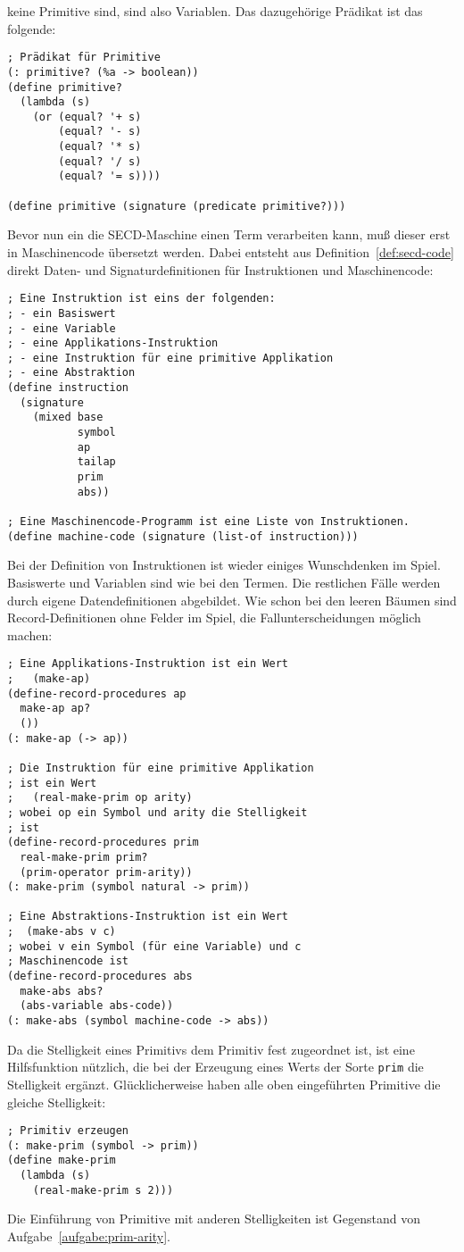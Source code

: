 keine Primitive sind, sind also Variablen.  Das dazugehörige Prädikat
ist das folgende:
%
\begin{verbatim}
; Prädikat für Primitive
(: primitive? (%a -> boolean))
(define primitive?
  (lambda (s)
    (or (equal? '+ s)
        (equal? '- s)
        (equal? '* s)
        (equal? '/ s)
        (equal? '= s))))

(define primitive (signature (predicate primitive?)))
\end{verbatim}
%
Bevor nun ein die SECD-Maschine einen Term verarbeiten kann, muß
dieser erst in Maschinencode übersetzt werden.  Dabei entsteht aus
Definition~\ref{def:secd-code} direkt Daten- und Signaturdefinitionen
für Instruktionen und Maschinencode:
%
\begin{verbatim}
; Eine Instruktion ist eins der folgenden:
; - ein Basiswert
; - eine Variable
; - eine Applikations-Instruktion
; - eine Instruktion für eine primitive Applikation
; - eine Abstraktion
(define instruction
  (signature
    (mixed base
           symbol
           ap
           tailap
           prim
           abs))

; Eine Maschinencode-Programm ist eine Liste von Instruktionen.
(define machine-code (signature (list-of instruction)))
\end{verbatim}
%
Bei der Definition von Instruktionen ist wieder einiges Wunschdenken
im Spiel.  Basiswerte und Variablen sind wie bei den Termen.  Die
restlichen Fälle werden durch eigene Datendefinitionen abgebildet.
Wie schon bei den leeren Bäumen sind Record-Definitionen ohne Felder
im Spiel, die Fallunterscheidungen möglich machen:
%
\begin{verbatim}
; Eine Applikations-Instruktion ist ein Wert
;   (make-ap)
(define-record-procedures ap
  make-ap ap?
  ())
(: make-ap (-> ap))

; Die Instruktion für eine primitive Applikation
; ist ein Wert
;   (real-make-prim op arity)
; wobei op ein Symbol und arity die Stelligkeit
; ist
(define-record-procedures prim
  real-make-prim prim?
  (prim-operator prim-arity))
(: make-prim (symbol natural -> prim))

; Eine Abstraktions-Instruktion ist ein Wert
;  (make-abs v c)
; wobei v ein Symbol (für eine Variable) und c
; Maschinencode ist
(define-record-procedures abs
  make-abs abs?
  (abs-variable abs-code))
(: make-abs (symbol machine-code -> abs))
\end{verbatim}
%
Da die Stelligkeit eines Primitivs dem Primitiv fest zugeordnet
ist, ist eine Hilfsfunktion nützlich, die bei der Erzeugung eines
Werts der Sorte \texttt{prim} die Stelligkeit ergänzt.
Glücklicherweise haben alle oben eingeführten Primitive die gleiche
Stelligkeit:
%
\begin{verbatim}
; Primitiv erzeugen
(: make-prim (symbol -> prim))
(define make-prim
  (lambda (s)
    (real-make-prim s 2)))
\end{verbatim}
%
Die Einführung von Primitive mit anderen Stelligkeiten ist Gegenstand
von Aufgabe~\ref{aufgabe:prim-arity}.

